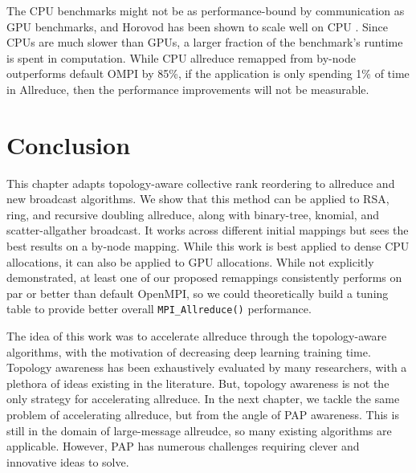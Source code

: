 The \gls{CPU} benchmarks might not be as performance-bound by communication as \gls{GPU} benchmarks, and Horovod has been shown to scale well on \gls{CPU} \cite{Jain2019ScaleTFPTMXNonFrontera}.
Since \gls{CPU}s are much slower than \gls{GPU}s, a larger fraction of the benchmark's runtime is spent in computation.
While \gls{CPU} allreduce remapped from by-node outperforms default OMPI by 85\%, if the application is only spending 1\% of time in Allreduce, then the performance improvements will not be measurable.

\section{Conclusion}
This chapter adapts topology-aware collective rank reordering to allreduce and new broadcast algorithms.
We show that this method can be applied to \gls{RSA}, ring, and recursive doubling allreduce, along with binary-tree, knomial, and scatter-allgather broadcast.
It works across different initial mappings but sees the best results on a by-node mapping.
While this work is best applied to dense \gls{CPU} allocations, it can also be applied to \gls{GPU} allocations. 
While not explicitly demonstrated, at least one of our proposed remappings consistently performs on par or better than default OpenMPI, so we could theoretically build a tuning table to provide better overall \texttt{MPI\_Allreduce()} performance. 

The idea of this work was to accelerate allreduce through the topology-aware algorithms, with the motivation of decreasing deep learning training time.
Topology awareness has been exhaustively evaluated by many researchers, with a plethora of ideas existing in the literature.
But, topology awareness is not the only strategy for accelerating allreduce.
In the next chapter, we tackle the same problem of accelerating allreduce, but from the angle of PAP awareness.
This is still in the domain of large-message allreudce, so many existing algorithms are applicable. 
However, \gls{PAP} has numerous challenges requiring clever and innovative ideas to solve.
